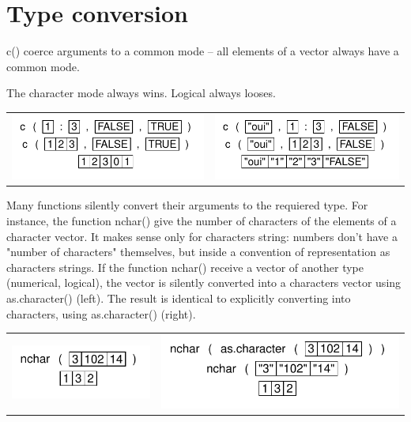 \documentclass[pdflatex]{article}
\begin{document}
\section{Type conversion}

c() coerce arguments to a common mode -- all elements of a vector always have a common mode.

The character mode always wins. Logical always looses.

\begin{tabular}{cc}
\includegraphics{conversion_1} & \includegraphics{conversion}\\
\end{tabular}

Many functions silently convert their arguments to the requiered type. For
instance, the function nchar() give the number of characters of the elements of
a character vector. It makes sense only for characters string: numbers don't
have a "number of characters" themselves, but inside a convention of
representation as characters strings. If the function nchar() receive a vector
of another type (numerical, logical), the vector is silently converted into a
characters vector using as.character() (left). The result is identical to
explicitly converting into characters, using as.character() (right).

\begin{tabular}{cc}
\includegraphics{conversion_nchar} & \includegraphics{conversion_as_character}\\
\end{tabular}
\end{document}
